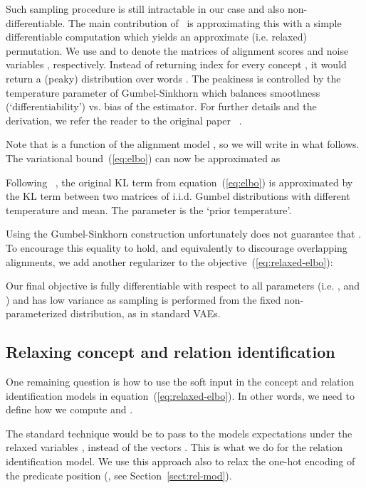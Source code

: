 \documentclass[11pt,a4paper]{article}
\begin{document}
Such sampling procedure is still intractable in our case and also non-differentiable.
The main contribution of~ is approximating this 
with a simple differentiable computation  which yields an approximate (i.e. relaxed) permutation. We use  and  to denote the  matrices of alignment scores  and noise variables , respectively.  Instead of returning index  for every concept ,  it would return a (peaky) distribution over words . The peakiness is controlled by the temperature parameter  of Gumbel-Sinkhorn  which balances smoothness (`differentiability') vs. bias of the estimator. 
For further details and the derivation, we refer the reader to the original paper ~\cite{sinkhorn}.


Note that  is a function of  the alignment model , so we will write  in what follows. The variational  bound~(\ref{eq:elbo}) can now be approximated as

Following ~, the original KL term from equation~(\ref{eq:elbo}) is approximated by the KL term between two  matrices of i.i.d. Gumbel distributions with different temperature and mean. The parameter  is the `prior temperature'. 

Using the Gumbel-Sinkhorn construction unfortunately does not guarantee
that .
To encourage this equality to hold, and equivalently to discourage overlapping alignments, we add another regularizer to the objective~(\ref{eq:relaxed-elbo}): 



Our final objective is fully differentiable with respect to all parameters (i.e. ,  and ) and has low variance as sampling is performed from the fixed non-parameterized distribution, as in standard VAEs.

\subsection{Relaxing concept and relation identification}\label{sec:relax}

One remaining question is how to use the soft input  in the concept and relation identification models in equation~(\ref{eq:relaxed-elbo}). In other words, we need to define how we  compute  and . 

The standard technique would be to pass to the models expectations under the relaxed variables , instead of the vectors  \cite{maddison2016concrete,jang2016categorical}. This is what we do for the relation identification model. We use this approach also 
to relax the one-hot encoding of the predicate position (, see Section~\ref{sect:rel-mod}).
\end{document}
